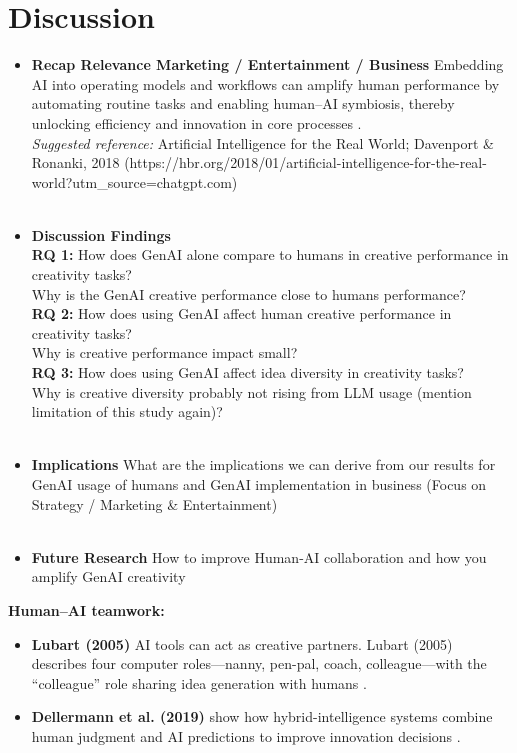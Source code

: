 \documentclass[acmsmall,authorversion]{acmart}
\begin{document}
\section{Discussion}
\label{sec:Discussion}

\begin{itemize}
    \item \textbf{Recap Relevance Marketing / Entertainment / Business} Embedding AI into operating models and workflows can amplify human performance by automating routine tasks and enabling human–AI symbiosis, thereby unlocking efficiency and innovation in core processes \citep{DavenportRonanki2018}.  
    \\ \emph{Suggested reference:} Artificial Intelligence for the Real World; Davenport \& Ronanki, 2018 (https://hbr.org/2018/01/artificial-intelligence-for-the-real-world?utm\_source=chatgpt.com)
\\ \\
    \item \textbf{Discussion Findings}    \\
    \textbf{RQ 1:} How does GenAI alone compare to humans in creative performance in creativity tasks? \\ Why is the GenAI creative performance close to humans performance?\\
    \textbf{RQ 2:} How does using GenAI affect human creative performance in creativity tasks? \\ Why is creative performance impact small?\\
    \textbf{RQ 3:} How does using GenAI affect idea diversity in creativity tasks? \\ Why is creative diversity probably not rising from LLM usage (mention limitation of this study again)?\\
    \\
    \item \textbf{Implications} What are the implications we can derive from our results for GenAI usage of humans and GenAI implementation in business (Focus on Strategy / Marketing \& Entertainment) 
\\ \\
    \item \textbf{Future Research} How to improve Human-AI collaboration and how you amplify GenAI creativity
\end{itemize}
\textbf{Human–AI teamwork:}  
    \begin{itemize}
         \item \textbf{Lubart (2005)} AI tools can act as creative partners. Lubart (2005) describes four computer roles—nanny, pen-pal, coach, colleague—with the “colleague” role sharing idea generation with humans \cite{LUBART2005365}.  
         \item \textbf{Dellermann et al. (2019)} show how hybrid-intelligence systems combine human judgment and AI predictions to improve innovation decisions \cite{Dellermann2019}.
    \end{itemize}
\end{document}
